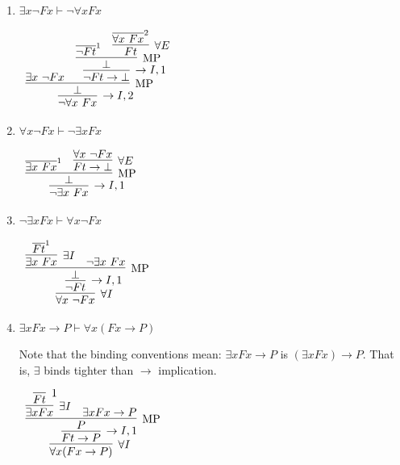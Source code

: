 \documentclass[11pt]{report}
\newcommand{\temp}[2]{{\overline{#2}}^{#1}}
\begin{document}
\begin{enumerate}
\begin{enumerate}
			\item $\exists x \neg Fx \vdash  \neg  \forall x Fx$
			
			\begin{center}
				$\begin{array}{c}
					\infer[\to I,2]{\lnot \forall x \ Fx}
						{\infer[\MP]{\bot}
							{\exists x \ \lnot Fx
							&
							\infer[\to I,1]{\lnot Ft \to \bot}
								{\infer[\MP]{\bot}
									{\temp{1}{\lnot Ft}
									&
									\infer[\forall E]{Ft}
										{\temp{2}{\forall x \ Fx}}}}}}
				\end{array}$
			\end{center}
			
			\item $\forall x \neg Fx  \vdash  \neg \exists x Fx$
			
			\begin{center}
				$\begin{array}{c}
					\infer[\to I,1]{\lnot \exists x \ Fx}
						{\infer[\MP]{\bot}
							{\temp{1}{\exists x \ Fx}
							&
							\infer[\forall E]{Ft \to \bot}
								{\forall x \ \lnot F x}}}
				\end{array}$
			\end{center}
			
			\item $\neg \exists x Fx \vdash \forall x \neg Fx $
			
			\begin{center}
				$\begin{array}{c}
					\infer[\forall I]{\forall x \ \lnot Fx}
						{\infer[\to I,1]{\lnot Ft}
							{\infer[\MP]{\bot}
								{\infer[\exists I]{\exists x \ Fx}
									{\temp{1}{Ft}}
								&
								\lnot \exists x \ Fx}}}
				\end{array}$
			\end{center}
			
			\item $ \exists x Fx \to P \vdash \forall x (Fx \to P)$
			
			Note that the binding conventions mean: $\exists x Fx \to P$ is $(\exists x Fx) \to P$. That is, $\exists$ binds tighter than $\to$ implication. 
			
			\begin{center}
				$\begin{array}{c}
					\infer[\forall I]{\forall x (Fx \to P)}
						{\infer[\to I,1]{Ft \to P}
							{\infer[\MP]{P}
								{\infer[\exists I]{\exists x Fx}
									{\infer[1]{Ft}{}}
								&
								\exists x Fx \to P}}}
				\end{array}$
			\end{center}
			

\end{enumerate}
\end{enumerate}
\end{document}
